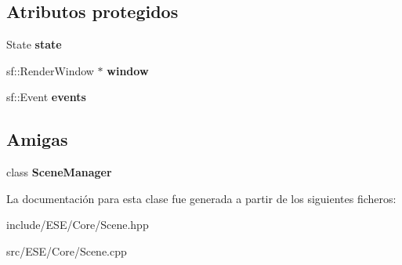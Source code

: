 \subsection*{Atributos protegidos}
\begin{DoxyCompactItemize}
\item 
\hypertarget{class_e_s_e_1_1_scene_a0d460f2365daaf835c7f36cbce28cd42}{State {\bfseries state}}\label{class_e_s_e_1_1_scene_a0d460f2365daaf835c7f36cbce28cd42}

\item 
\hypertarget{class_e_s_e_1_1_scene_aeba78c8125ff759da93cfeadf89bf1f2}{sf\-::\-Render\-Window $\ast$ {\bfseries window}}\label{class_e_s_e_1_1_scene_aeba78c8125ff759da93cfeadf89bf1f2}

\item 
\hypertarget{class_e_s_e_1_1_scene_a2086a9c827c7cc684d7e36a757d5ff3b}{sf\-::\-Event {\bfseries events}}\label{class_e_s_e_1_1_scene_a2086a9c827c7cc684d7e36a757d5ff3b}

\end{DoxyCompactItemize}
\subsection*{Amigas}
\begin{DoxyCompactItemize}
\item 
\hypertarget{class_e_s_e_1_1_scene_a284464b0561a6f2915f04b0245b987f0}{class {\bfseries Scene\-Manager}}\label{class_e_s_e_1_1_scene_a284464b0561a6f2915f04b0245b987f0}

\end{DoxyCompactItemize}


La documentación para esta clase fue generada a partir de los siguientes ficheros\-:\begin{DoxyCompactItemize}
\item 
include/\-E\-S\-E/\-Core/Scene.\-hpp\item 
src/\-E\-S\-E/\-Core/Scene.\-cpp\end{DoxyCompactItemize}
